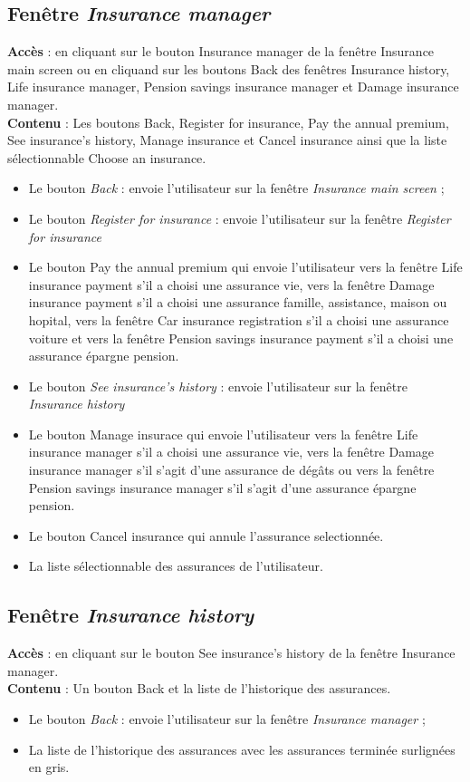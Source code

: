 \documentclass{article}
\newcommand{\navbutton}[2]{Le bouton \emph{#1} : envoie l'utilisateur sur la fenêtre \emph{#2}}
\newcommand{\access}[1]{ \noindent\textbf{Accès} : #1 \\}
\newcommand{\content}[1]{\textbf{Contenu} : #1}
\begin{document}
\subsection{Fenêtre \emph{Insurance manager}}
\access{en cliquant sur le bouton Insurance manager de la fenêtre Insurance main screen ou en cliquand sur les boutons Back des fenêtres Insurance history, Life insurance manager, Pension savings insurance manager et Damage insurance manager.}
\content{Les boutons Back, Register for insurance, Pay the annual premium, See insurance's history, Manage insurance et Cancel insurance ainsi que la liste sélectionnable Choose an insurance.}
\begin{itemize}
\item \navbutton{Back}{Insurance main screen} ;
\item \navbutton{Register for insurance}{Register for insurance}
\item Le bouton Pay the annual premium qui envoie l'utilisateur vers la fenêtre Life insurance payment s'il a choisi une assurance vie, vers la fenêtre Damage insurance payment s'il a choisi une assurance famille, assistance, maison ou hopital, vers la fenêtre Car insurance registration s'il a choisi une assurance voiture et vers la fenêtre Pension savings insurance payment s'il a choisi une assurance épargne pension.
\item \navbutton{See insurance's history}{Insurance history}
\item Le bouton Manage insurace qui envoie l'utilisateur vers la fenêtre Life insurance manager s'il a choisi une assurance vie, vers la fenêtre Damage insurance manager s'il s'agit d'une assurance de dégâts ou vers la fenêtre Pension savings insurance manager s'il s'agit d'une assurance épargne pension.
\item Le bouton Cancel insurance qui annule l'assurance selectionnée.
\item La liste sélectionnable des assurances de l'utilisateur.
\end{itemize}


\subsection{Fenêtre \emph{Insurance history}}
\access{en cliquant sur le bouton See insurance's history de la fenêtre Insurance manager.}
\content{Un bouton Back et la liste de l'historique des assurances.}
\begin{itemize}
\item \navbutton{Back}{Insurance manager} ;
\item La liste de l'historique des assurances avec les assurances terminée surlignées en gris.
\end{itemize}
\end{document}
